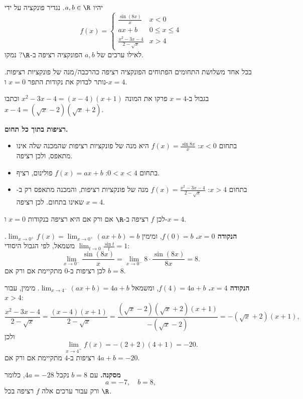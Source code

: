 
\begin{question}
יהיו $a,b\in\R$. נגדיר פונקציה על ידי
\[ f(x)=\begin{cases} \frac{\sin(8x)}{x} & x<0\\[2pt] ax+b & 0\le x\le 4\\[2pt] \frac{x^2-3x-4}{2-\sqrt{x}} & x>4 \end{cases} \]
לאילו ערכים של $a,b$ הפונקציה רציפה ב-$\R$? נמקו.
\end{question}

\begin{hint}
בכל אחד משלושת התחומים הפתוחים הפונקציה רציפה כהרכבה/מנה של פונקציות רציפות. נותר לבדוק את נקודות התפר $x=0$ ו-$x=4$.
\end{hint}

\begin{hint}
בגבול ב-$x=4$ פרקו את המונה $x^2-3x-4=(x-4)(x+1)$ וכתבו $x-4=(\sqrt x-2)(\sqrt x+2)$.
\end{hint}

\begin{solution}
\textbf{רציפות בתוך כל תחום.}
\begin{itemize}
  \item בתחום $x<0$: $f(x)=\frac{\sin 8x}{x}$ היא מנה של פונקציות רציפות שהמכנה שלה אינו מתאפס, ולכן רציפה.
  \item בתחום $0<x<4$: $f(x)=ax+b$ פולינום, רציף.
  \item בתחום $x>4$: $f(x)=\frac{x^2-3x-4}{2-\sqrt x}$ מנה של פונקציות רציפות, והמכנה מתאפס רק ב-$x=4$ שאינו בתחום. לכן רציפה.
\end{itemize}
לכן $f$ רציפה ב-$\R$ אם ורק אם היא רציפה בנקודות $x=0$ ו-$x=4$.

\textbf{הנקודה $x=0$.} $f(0)=b$, ומימין $\lim_{x\to0^+}f(x)=\lim_{x\to0^+}(ax+b)=b$. משמאל, לפי הגבול היסודי $\lim_{t\to0}\frac{\sin t}{t}=1$:
\[ \lim_{x\to0^-}\frac{\sin(8x)}{x} = \lim_{x\to0^-}8\cdot\frac{\sin(8x)}{8x} = 8. \]
לכן רציפות ב-$0$ מתקיימת אם ורק אם $b=8$.

\textbf{הנקודה $x=4$.} $f(4)=4a+b$, ומשמאל $\lim_{x\to4^-}(ax+b)=4a+b$. מימין, עבור $x>4$:
\[ \frac{x^2-3x-4}{2-\sqrt x} = \frac{(x-4)(x+1)}{2-\sqrt x} = \frac{(\sqrt x-2)(\sqrt x+2)(x+1)}{-(\sqrt x-2)} = -(\sqrt x+2)(x+1), \]
ולכן
\[ \lim_{x\to4^+}f(x) = -(2+2)(4+1) = -20. \]
רציפות ב-$4$ מתקיימת אם ורק אם $4a+b=-20$.

\textbf{מסקנה.} עם $b=8$ נקבל $4a=-28$, כלומר
\[ \boxed{a=-7,\quad b=8}, \]
ורק עבור ערכים אלה $f$ רציפה בכל $\R$.
\end{solution}
